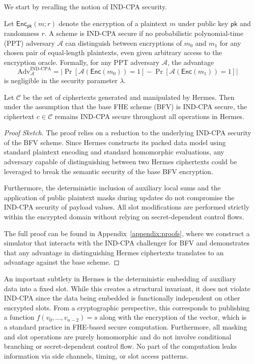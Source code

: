 \documentclass[sigconf,nonacm]{acmart}
\begin{document}
We start by recalling the notion of IND-CPA security.
\begin{definition}
Let $\mathsf{Enc}_\mathsf{pk}(m; r)$ denote the encryption of a plaintext $m$ under public key $\mathsf{pk}$ and randomness $r$. A scheme is IND-CPA secure if no probabilistic polynomial-time (PPT) adversary $\mathcal{A}$ can distinguish between encryptions of $m_0$ and $m_1$ for any chosen pair of equal-length plaintexts, even given arbitrary access to the encryption oracle. Formally, for any PPT adversary $\mathcal{A}$, the advantage
\[
\text{Adv}_\mathcal{A}^{\text{IND-CPA}} = \left| \Pr[\mathcal{A}(\mathsf{Enc}(m_0)) = 1] - \Pr[\mathcal{A}(\mathsf{Enc}(m_1)) = 1] \right|
\]
is negligible in the security parameter $\lambda$.
\end{definition}

\begin{lemma}
Let $\mathcal{C}$ be the set of ciphertexts generated and manipulated by Hermes. Then under the assumption that the base FHE scheme (BFV) is IND-CPA secure, the ciphertext $c \in \mathcal{C}$ remains IND-CPA secure throughout all operations in Hermes.
\end{lemma}

\begin{proof}[Proof Sketch]
The proof relies on a reduction to the underlying IND-CPA security of the BFV scheme. Since Hermes constructs its packed data model using standard plaintext encoding and standard homomorphic evaluations, any adversary capable of distinguishing between two Hermes ciphertexts could be leveraged to break the semantic security of the base BFV encryption. 

Furthermore, the deterministic inclusion of auxiliary local sums and the application of public plaintext masks during updates do not compromise the IND-CPA security of payload values. All slot modifications are performed strictly within the encrypted domain without relying on secret-dependent control flows.

The full proof can be found in Appendix~\ref{appendix:proofs}, where we construct a simulator that interacts with the IND-CPA challenger for BFV and demonstrates that any advantage in distinguishing Hermes ciphertexts translates to an advantage against the base scheme.
\end{proof}

An important subtlety in Hermes is the deterministic embedding of auxiliary data into a fixed slot. While this creates a structural invariant, it does not violate IND-CPA since the data being embedded is functionally independent on other encrypted slots. From a cryptographic perspective, this corresponds to publishing a function $f(v_0, \dots, v_{n-2}) = s$ along with the encryption of the vector, which is a standard practice in FHE-based secure computation.
Furthermore, all masking and slot operations are purely homomorphic and do not involve conditional branching or secret-dependent control flow. No part of the computation leaks information via side channels, timing, or slot access patterns. 
\end{document}
